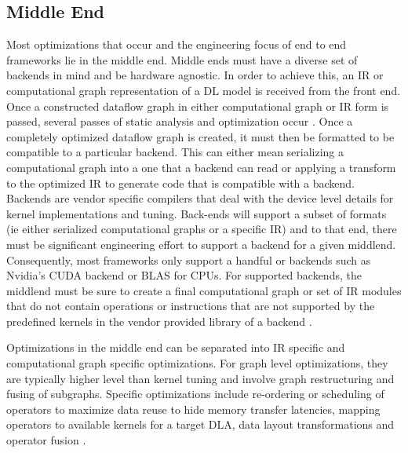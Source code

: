 \subsection{Middle End}
Most optimizations that occur and the engineering focus of end to end
frameworks lie in the middle end. Middle ends must have a diverse set of
backends in mind and be hardware agnostic. In order to achieve this, an IR or
computational graph representation of a DL model is received from the front
end. Once a constructed dataflow graph in either computational graph or IR
form is passed, several passes of static analysis and optimization occur
\cite{TVM} \cite{DLVM} \cite{tensorflow}. Once a completely optimized dataflow
graph is created, it must then be formatted to be compatible to a particular
backend. This can either mean serializing a computational graph into a one
that a backend can read or applying a transform to the optimized IR to generate
code that is compatible with a backend. Backends are vendor specific compilers
that deal with the device level details for kernel implementations and tuning.
Back-ends will support a subset of formats (ie either serialized computational
graphs or a specific IR) and to that end, there must be significant engineering
effort to support a backend for a given middlend. Consequently, most frameworks
only support a handful or backends such as Nvidia's CUDA backend or BLAS for
CPUs. For supported backends, the middlend must be sure to create a final
computational graph or set of IR modules that do not contain operations or
instructions that are not supported by the predefined kernels in the vendor
provided library of a backend \cite{TVM}.

Optimizations in the middle end can be separated into IR specific and
computational graph specific optimizations. For graph level optimizations,
they are typically higher level than kernel tuning and involve graph
restructuring and fusing of subgraphs. Specific optimizations include
re-ordering or scheduling of operators to maximize data reuse
to hide memory transfer latencies, mapping operators to available kernels
for a target DLA, data layout transformations and operator fusion \cite{TVM}.

